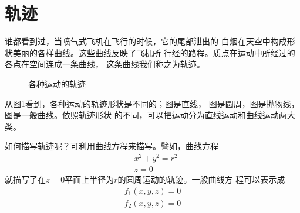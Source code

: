 \section[轨迹]{轨\hspace{3em}迹}\label{sec:01.05}

谁都看到过，当喷气式飞机在飞行的时候，它的尾部泄出的
白烟在天空中构成形状美丽的各样曲线。这些曲线反映了飞机所
行经的路程。质点在运动中所经过的各点在空间连成一条曲线，
这条曲线我们称之为轨迹。

\begin{figure}[!h]
 \hspace{3em}
 \hspace{3em}

 \hspace{3.7em}
 \hspace{1.3em}
 \caption{各种运动的轨迹}
 \label{fig:01.06}
\end{figure}

\clearpage

从图\ref{fig:01.06}看到，各种运动的轨迹形状是不同的；图是直线，
图是圆周，图是抛物线，图是一般曲线。依照轨迹形状
的不同，可以把运动分为直线运动和曲线运动两大类。

如何描写轨迹呢？可利用曲线方程来描写。譬如，曲线方程 \begin{equation*}
 \begin{aligned}
 & x^2+y^2=r^2 \\
 & z=0
 \end{aligned}
\end{equation*}
就描写了在$z=0$平面上半径为$r$的圆周运动的轨迹。一般曲线方
程可以表示成
\begin{equation*}
 \begin{aligned}
 f_1\left(x,y,z\right)=0 \\
 f_2\left(x,y,z\right)=0
 \end{aligned}
\end{equation*}

